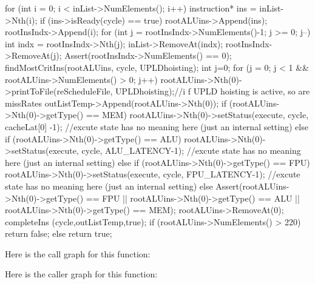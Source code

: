 \begin{DoxyCode}
                                                                                 
                                             {
        for (int i = 0; i < inList->NumElements(); i++) {
                instruction* ins = inList->Nth(i);
                if (ins->isReady(cycle) == true) {
                        rootALUins->Append(ins);
                        rootInsIndx->Append(i);
                }
        }
        for (int j = rootInsIndx->NumElements()-1; j >= 0; j--) {
                int indx = rootInsIndx->Nth(j);
                inList->RemoveAt(indx);
                rootInsIndx->RemoveAt(j);
        }
        Assert(rootInsIndx->NumElements() == 0);
        findMostCritIns(rootALUins, cycle, UPLDhoisting);
        int j=0;
        for (j = 0; j < 1 && rootALUins->NumElements() > 0; j++) {
                rootALUins->Nth(0)->printToFile(reScheduleFile, UPLDhoisting);//i
      f UPLD hoisting is active, so are missRates
                outListTemp->Append(rootALUins->Nth(0));
                if (rootALUins->Nth(0)->getType() == MEM) {
                        rootALUins->Nth(0)->setStatus(execute, cycle, cacheLat[0]
      -1); //excute state has no meaning here (just an internal setting)
                } else if (rootALUins->Nth(0)->getType() == ALU) {
                        rootALUins->Nth(0)->setStatus(execute, cycle, 
      ALU_LATENCY-1); //excute state has no meaning here (just an internal setting)
                } else if (rootALUins->Nth(0)->getType() == FPU) {
                        rootALUins->Nth(0)->setStatus(execute, cycle, 
      FPU_LATENCY-1); //excute state has no meaning here (just an internal setting)
                } else {
                        Assert(rootALUins->Nth(0)->getType() == FPU || 
                               rootALUins->Nth(0)->getType() == ALU || 
                               rootALUins->Nth(0)->getType() == MEM);
                }
                rootALUins->RemoveAt(0);
        }
        completeIns (cycle,outListTemp,true);
        if (rootALUins->NumElements() > 220)
                return false;
        else
                return true;
}
\end{DoxyCode}


Here is the call graph for this function:




Here is the caller graph for this function:



